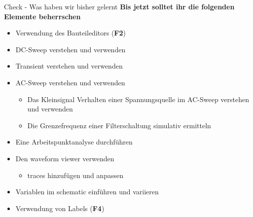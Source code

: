 \begin{frame}[t]{Check - Was haben wir bisher gelernt}
    \textbf{Bis jetzt solltet ihr die folgenden Elemente beherrschen}
    \begin{itemize}
        \item Verwendung des Bauteileditors (\textbf{F2})
        \item DC-Sweep verstehen und verwenden
        \item Transient verstehen und verwenden
        \item AC-Sweep verstehen und verwenden
              \begin{itemize}
                  \item Das Kleinsignal Verhalten einer Spannungsquelle im AC-Sweep verstehen und verwenden
                  \item Die Grenzefrequenz einer Filterschaltung simulativ ermitteln
              \end{itemize}
        \item Eine Arbeitspunktanalyse durchführen
        \item Den waveform viewer verwenden
              \begin{itemize}
                  \item traces hinzufügen und anpassen
              \end{itemize}
        \item Variablen im schematic einführen und variieren
        \item Verwendung von Labels (\textbf{F4})
    \end{itemize}
\end{frame}